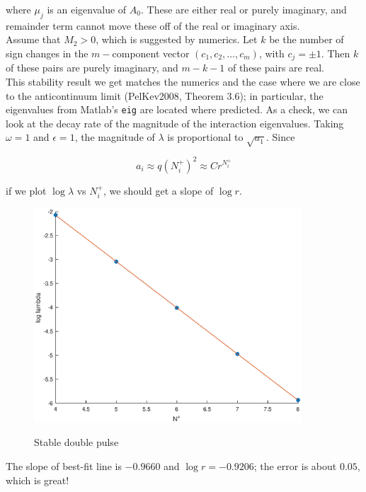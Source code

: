 \documentclass[12pt]{article}
\begin{document}
where $\mu_j$ is an eigenvalue of $A_0$. These are either real or purely imaginary, and remainder term cannot move these off of the real or imaginary axis. \\

Assume that $M_2 > 0$, which is suggested by numerics. Let $k$ be the number of sign changes in the $m-$component vector $(c_1, c_2, \dots, c_m)$, with $c_j = \pm 1$. Then $k$ of these pairs are purely imaginary, and $m - k - 1$ of these pairs are real.\\

This stability result we get matches the numerics and the case where we are close to the anticontinuum limit (PelKev2008, Theorem 3.6); in particular, the eigenvalues from Matlab's \texttt{eig} are located where predicted. As a check, we can look at the decay rate of the magnitude of the interaction eigenvalues. Taking $\omega = 1$ and $\epsilon = 1$, the magnitude of $\lambda$ is proportional to $\sqrt{a_1}$. Since

\[
a_i \approx q(N_i^+)^2 \approx C r^{N_i^+}
\] 

if we plot $\log \lambda$ vs $N_i^+$, we should get a slope of $\log r$.

\begin{figure}[H]
\centering
\includegraphics[width=10cm]{dnlslog.eps}
\label{fig:spec1}
\caption{Stable double pulse}
\end{figure}

The slope of best-fit line is $-0.9660$ and $\log r = -0.9206$; the error is about $0.05$, which is great!
\end{document}
